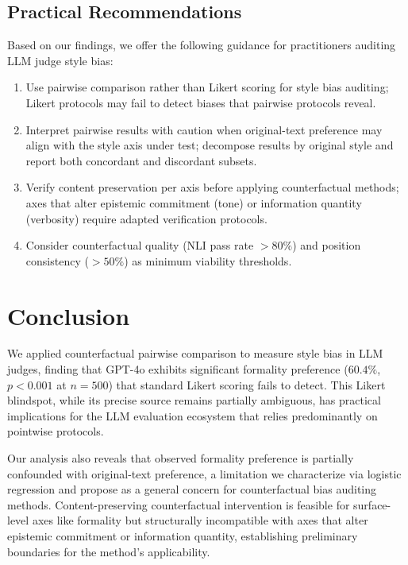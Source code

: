 \documentclass[11pt,a4paper]{article}
\begin{document}
\subsection{Practical Recommendations}

Based on our findings, we offer the following guidance for practitioners auditing LLM judge style bias:
\begin{enumerate}[nosep,leftmargin=*]
\item Use pairwise comparison rather than Likert scoring for style bias auditing; Likert protocols may fail to detect biases that pairwise protocols reveal.
\item Interpret pairwise results with caution when original-text preference may align with the style axis under test; decompose results by original style and report both concordant and discordant subsets.
\item Verify content preservation per axis before applying counterfactual methods; axes that alter epistemic commitment (tone) or information quantity (verbosity) require adapted verification protocols.
\item Consider counterfactual quality (NLI pass rate $>80\%$) and position consistency ($>50\%$) as minimum viability thresholds.
\end{enumerate}

\section{Conclusion}

We applied counterfactual pairwise comparison to measure style bias in LLM judges, finding that GPT-4o exhibits significant formality preference ($60.4\%$, $p<0.001$ at $n=500$) that standard Likert scoring fails to detect.
This Likert blindspot, while its precise source remains partially ambiguous, has practical implications for the LLM evaluation ecosystem that relies predominantly on pointwise protocols.

Our analysis also reveals that observed formality preference is partially confounded with original-text preference, a limitation we characterize via logistic regression and propose as a general concern for counterfactual bias auditing methods.
Content-preserving counterfactual intervention is feasible for surface-level axes like formality but structurally incompatible with axes that alter epistemic commitment or information quantity, establishing preliminary boundaries for the method's applicability.
\end{document}
